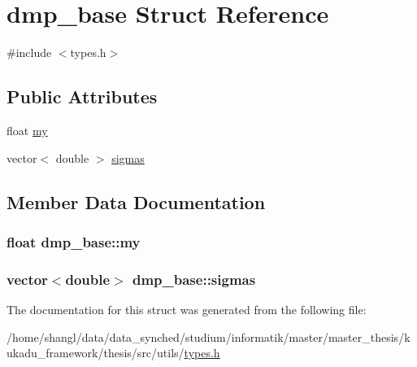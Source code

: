 \hypertarget{structdmp__base}{\section{dmp\-\_\-base \-Struct \-Reference}
\label{structdmp__base}
}


{\ttfamily \#include $<$types.\-h$>$}

\subsection*{\-Public \-Attributes}
\begin{DoxyCompactItemize}
\item 
float \hyperlink{structdmp__base_a21e28aea003dbed839a72d51d757dc21}{my}
\item 
vector$<$ double $>$ \hyperlink{structdmp__base_af8f3e9a1e7af7e796e572dd7e1054b08}{sigmas}
\end{DoxyCompactItemize}


\subsection{\-Member \-Data \-Documentation}
\hypertarget{structdmp__base_a21e28aea003dbed839a72d51d757dc21}{
\subsubsection[{my}]{\setlength{\rightskip}{0pt plus 5cm}float {\bf dmp\-\_\-base\-::my}}}\label{structdmp__base_a21e28aea003dbed839a72d51d757dc21}
\hypertarget{structdmp__base_af8f3e9a1e7af7e796e572dd7e1054b08}{
\subsubsection[{sigmas}]{\setlength{\rightskip}{0pt plus 5cm}vector$<$double$>$ {\bf dmp\-\_\-base\-::sigmas}}}\label{structdmp__base_af8f3e9a1e7af7e796e572dd7e1054b08}


\-The documentation for this struct was generated from the following file\-:\begin{DoxyCompactItemize}
\item 
/home/shangl/data/data\-\_\-synched/studium/informatik/master/master\-\_\-thesis/kukadu\-\_\-framework/thesis/src/utils/\hyperlink{types_8h}{types.\-h}\end{DoxyCompactItemize}
